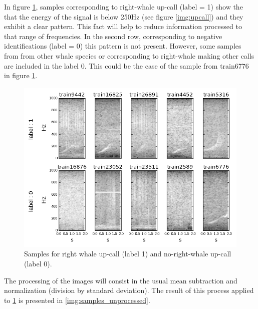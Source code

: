\documentclass[]{article}
\begin{document}
In figure \ref{img:samples}, samples corresponding to right-whale up-call (label = 1) show the that the energy of the signal is below 250Hz (see figure \ref{img:upcall}) and they exhibit a clear pattern. This fact will help to reduce information processed to that range of frequencies. 
In the second row, corresponding to negative identifications (label = 0) this pattern is not present. However, some samples from from other whale species or corresponding to right-whale making other calls are included in the label 0. This could be the case of the sample from train6776 in figure \ref{img:samples}.


\begin{figure}[htpb!]
\centering
\includegraphics[width= \textwidth]{./images/2_samples}
\caption{Samples for right whale up-call (label 1) and no-right-whale up-call (label 0).  \label{img:samples}}
\end{figure} 

The processing of the images will consist in the usual mean subtraction and normalization (division by standard deviation). The result of this process applied to \ref{img:samples} is presented in \ref{img:samples_unprocessed}.
\end{document}
